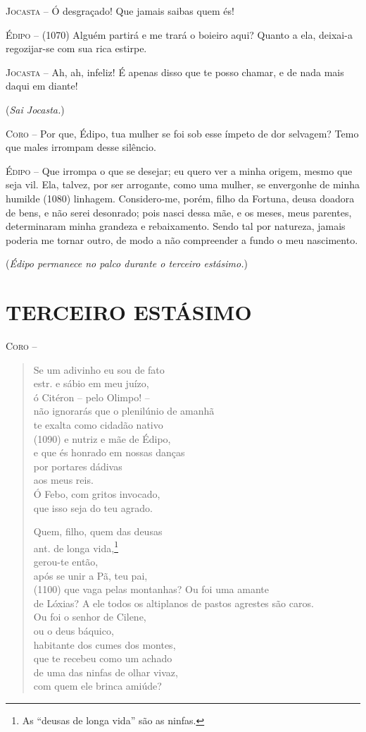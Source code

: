 \textsc{Jocasta} --   Ó desgraçado! Que jamais saibas quem és!

\textsc{Édipo} --   (1070) Alguém partirá e me trará o boieiro aqui? Quanto a ela, deixai-a
regozijar-se com sua rica estirpe.

\textsc{Jocasta} --   Ah, ah, infeliz! É apenas disso que te posso chamar, e de nada mais
daqui em diante!

(\emph{Sai Jocasta.})

\textsc{Coro} --   Por que, Édipo, tua mulher se foi sob esse ímpeto de dor selvagem? Temo
que males irrompam desse silêncio.

\textsc{Édipo} --   Que irrompa o que se desejar; eu quero ver a minha origem, mesmo que
seja vil. Ela, talvez, por ser arrogante, como uma mulher, se envergonhe
de minha humilde (1080) linhagem. Considero-me, porém, filho da Fortuna,
deusa doadora de bens, e não serei desonrado; pois nasci dessa mãe, e os
meses, meus parentes, determinaram minha grandeza e rebaixamento. Sendo
tal por natureza, jamais poderia me tornar outro, de modo a não
compreender a fundo o meu nascimento.

(\emph{Édipo permanece no palco durante o terceiro estásimo.})

\section{TERCEIRO ESTÁSIMO}

\textsc{Coro} -- \begin{verse}Se um adivinho eu sou de fato\\ estr.
e sábio em meu juízo,\\
ó Citéron -- pelo Olimpo! --\\
não ignorarás que o plenilúnio de amanhã\\
te exalta como cidadão nativo\\ (1090)
e nutriz e mãe de Édipo,\\
e que és honrado em nossas danças\\
por portares dádivas\\
aos meus reis.\\
Ó Febo, com gritos invocado,\\
que isso seja do teu agrado.

Quem, filho, quem das deusas\\ ant.
de longa vida,\footnote{As ``deusas de longa vida'' são as ninfas.}\\
gerou-te então,\\
após se unir a Pã, teu pai,\\ (1100)
que vaga pelas montanhas? Ou foi uma amante\\
de Lóxias? A ele todos os altiplanos de pastos agrestes são caros.\\
Ou foi o senhor de Cilene,\\
ou o deus báquico,\\
habitante dos cumes dos montes,\\
que te recebeu como um achado\\
de uma das ninfas de olhar vivaz,\\
com quem ele brinca amiúde?
\end{verse}


